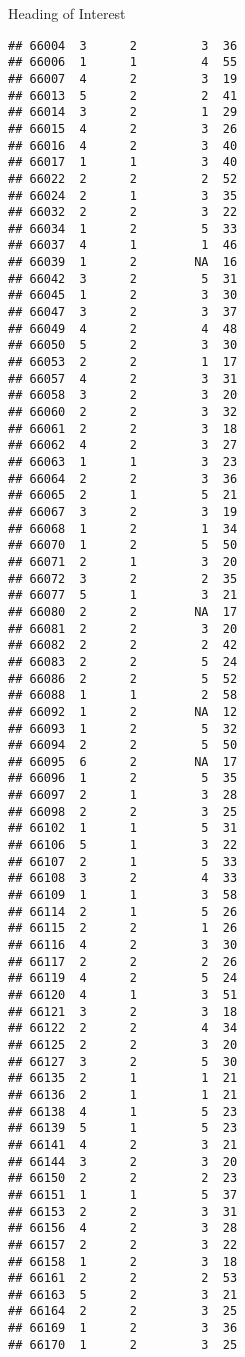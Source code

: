 \documentclass[
  ignorenonframetext,
]{beamer}
\begin{document}
\begin{frame}[fragile]{Heading of Interest}
\begin{verbatim}
## 66004  3      2         3  36
## 66006  1      1         4  55
## 66007  4      2         3  19
## 66013  5      2         2  41
## 66014  3      2         1  29
## 66015  4      2         3  26
## 66016  4      2         3  40
## 66017  1      1         3  40
## 66022  2      2         2  52
## 66024  2      1         3  35
## 66032  2      2         3  22
## 66034  1      2         5  33
## 66037  4      1         1  46
## 66039  1      2        NA  16
## 66042  3      2         5  31
## 66045  1      2         3  30
## 66047  3      2         3  37
## 66049  4      2         4  48
## 66050  5      2         3  30
## 66053  2      2         1  17
## 66057  4      2         3  31
## 66058  3      2         3  20
## 66060  2      2         3  32
## 66061  2      2         3  18
## 66062  4      2         3  27
## 66063  1      1         3  23
## 66064  2      2         3  36
## 66065  2      1         5  21
## 66067  3      2         3  19
## 66068  1      2         1  34
## 66070  1      2         5  50
## 66071  2      1         3  20
## 66072  3      2         2  35
## 66077  5      1         3  21
## 66080  2      2        NA  17
## 66081  2      2         3  20
## 66082  2      2         2  42
## 66083  2      2         5  24
## 66086  2      2         5  52
## 66088  1      1         2  58
## 66092  1      2        NA  12
## 66093  1      2         5  32
## 66094  2      2         5  50
## 66095  6      2        NA  17
## 66096  1      2         5  35
## 66097  2      1         3  28
## 66098  2      2         3  25
## 66102  1      1         5  31
## 66106  5      1         3  22
## 66107  2      1         5  33
## 66108  3      2         4  33
## 66109  1      1         3  58
## 66114  2      1         5  26
## 66115  2      2         1  26
## 66116  4      2         3  30
## 66117  2      2         2  26
## 66119  4      2         5  24
## 66120  4      1         3  51
## 66121  3      2         3  18
## 66122  2      2         4  34
## 66125  2      2         3  20
## 66127  3      2         5  30
## 66135  2      1         1  21
## 66136  2      1         1  21
## 66138  4      1         5  23
## 66139  5      1         5  23
## 66141  4      2         3  21
## 66144  3      2         3  20
## 66150  2      2         2  23
## 66151  1      1         5  37
## 66153  2      2         3  31
## 66156  4      2         3  28
## 66157  2      2         3  22
## 66158  1      2         3  18
## 66161  2      2         2  53
## 66163  5      2         3  21
## 66164  2      2         3  25
## 66169  1      2         3  36
## 66170  1      2         3  25

\end{verbatim}
\end{frame}
\end{document}
